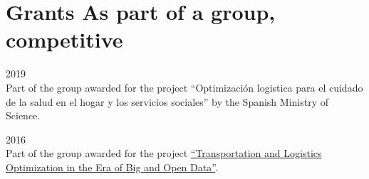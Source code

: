\section*{Grants \small{As part of a group, competitive}}

\begin{paracol}{2}
  2019
\switchcolumn
  \\
  Part of the group awarded for the project ``Optimización logistica para el cuidado de la salud en el hogar y los servicios sociales'' by the Spanish Ministry of Science.
\end{paracol}

\begin{paracol}{2}
  2016
\switchcolumn
  \\
  Part of the group awarded for the project \href{https://santini.in/files/cv/prin16.pdf}{``Transportation and Logistics Optimization in the Era of Big and Open Data''}.
\end{paracol}
